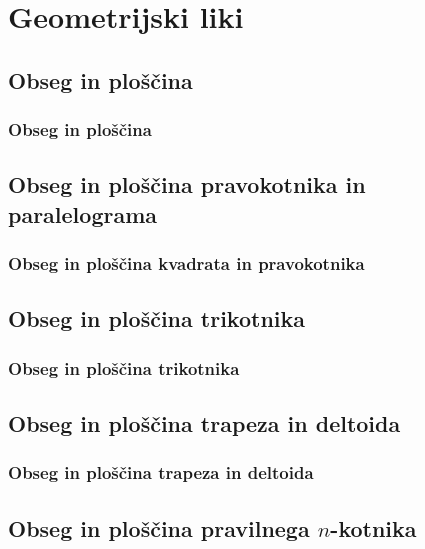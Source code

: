 \section{Geometrijski liki}

\begin{frame}
    \sectionpage
\end{frame}

\begin{frame}
\end{frame}


    \subsection{Obseg in ploščina}

        \begin{frame}
            \frametitle{Obseg in ploščina}
        \end{frame}


    \subsection{Obseg in ploščina pravokotnika in paralelograma}

        \begin{frame}
            \frametitle{Obseg in ploščina kvadrata in pravokotnika}
        \end{frame}


    \subsection{Obseg in ploščina trikotnika}

        \begin{frame}
            \frametitle{Obseg in ploščina trikotnika}
        \end{frame}


    \subsection{Obseg in ploščina trapeza in deltoida}

        \begin{frame}
            \frametitle{Obseg in ploščina trapeza in deltoida}
        \end{frame}


    \subsection{Obseg in ploščina pravilnega $n$-kotnika}

